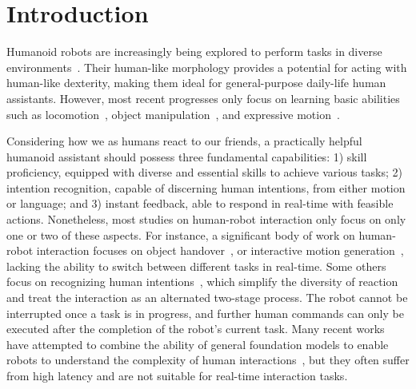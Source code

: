 
\section{Introduction}
Humanoid robots are increasingly being explored to perform tasks in diverse environments~\citep{agravante2019human,johnson2015team,Kheddar2019}. Their human-like morphology provides a potential for acting with human-like dexterity, making them ideal for general-purpose daily-life human assistants.
However, most recent progresses only focus on learning basic abilities such as locomotion~\cite{HumanoidTransformer2023}, object manipulation~\cite{cheng2024tv}, and expressive motion~\cite{cheng2024express}.

Considering how we as humans react to our friends, a practically helpful humanoid assistant should possess three fundamental capabilities:
1) skill proficiency, equipped with diverse and essential skills to achieve various tasks;
2) intention recognition, capable of discerning human intentions, from either motion or language; and
3) instant feedback, able to respond in real-time with feasible actions. 
Nonetheless, most studies on human-robot interaction only focus on only one or two of these aspects. %
For instance, a significant body of work on human-robot interaction focuses on
object handover~\citep{strabalaSeamlessHumanRobotHandovers2013, tulbureFastPerceptionHumanRobot2024}, or interactive motion generation~\citep{prasadMoVEIntMixtureVariational2024, butepageImitatingGeneratingDeep2019, liangInterGenDiffusionbasedMultihuman2024, liuPhysReactionPhysicallyPlausible2024, mascaroRobotInteractionBehavior2024}, lacking the ability to switch between different tasks in real-time.
Some others focus on recognizing human intentions~\citep{duarteActionAnticipationReading2018, enanRoboticDetectionHumanComprehensible2022, fangEgoPAT3Dv2Predicting3D2024, mascaro2023hoi4abot, scherfAreYouSure2024}, which simplify the diversity of reaction and treat the interaction as an alternated two-stage process. The robot cannot be interrupted once a task is in progress, and further human commands can only be executed after the completion of the robot's current task.
Many recent works have attempted to combine the ability of general foundation models to enable robots to understand the complexity of human interactions~\citep{tanneberg2024help, wuHumanObjectInteractionHumanLevel2024}, but they often suffer from high latency and are not suitable for real-time interaction tasks.
